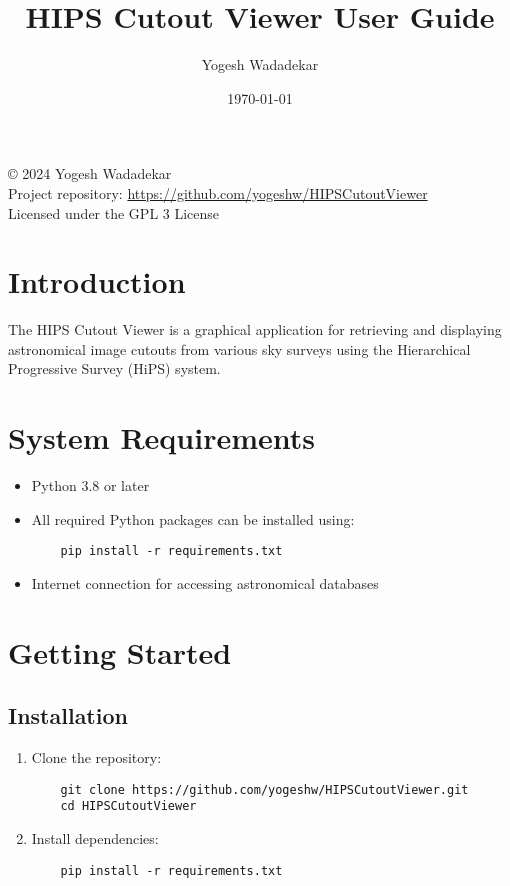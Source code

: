\documentclass{article}
\title{HIPS Cutout Viewer User Guide}
\author{Yogesh Wadadekar}
\date{\today}
\begin{document}
\maketitle

\begin{center}
\copyright{} 2024 Yogesh Wadadekar\\
\vspace{0.5em}
Project repository: \url{https://github.com/yogeshw/HIPSCutoutViewer}\\
\vspace{0.5em}
Licensed under the GPL 3 License
\end{center}

\section{Introduction}
The HIPS Cutout Viewer is a graphical application for retrieving and displaying astronomical image cutouts from various sky surveys using the Hierarchical Progressive Survey (HiPS) system.

\section{System Requirements}
\begin{itemize}
    \item Python 3.8 or later
    \item All required Python packages can be installed using:
    \begin{verbatim}
    pip install -r requirements.txt
    \end{verbatim}
    \item Internet connection for accessing astronomical databases
\end{itemize}

\section{Getting Started}
\subsection{Installation}
\begin{enumerate}
    \item Clone the repository:
    \begin{verbatim}
    git clone https://github.com/yogeshw/HIPSCutoutViewer.git
    cd HIPSCutoutViewer
    \end{verbatim}
    \item Install dependencies:
    \begin{verbatim}
    pip install -r requirements.txt
    \end{verbatim}
\end{enumerate}
\end{document}
